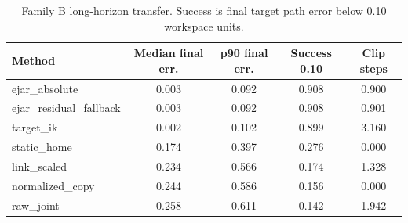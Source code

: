 \begin{table}[t]
\centering
\small
\caption{Family B long-horizon transfer. Success is final target path error below 0.10 workspace units.}
\label{tab:trajectory-v3}
\begin{tabular}{lcccc}
\toprule
Method & Median final err. & p90 final err. & Success 0.10 & Clip steps \\
\midrule
ejar\_absolute & 0.003 & 0.092 & 0.908 & 0.900 \\
ejar\_residual\_fallback & 0.003 & 0.092 & 0.908 & 0.901 \\
target\_ik & 0.002 & 0.102 & 0.899 & 3.160 \\
static\_home & 0.174 & 0.397 & 0.276 & 0.000 \\
link\_scaled & 0.234 & 0.566 & 0.174 & 1.328 \\
normalized\_copy & 0.244 & 0.586 & 0.156 & 0.000 \\
raw\_joint & 0.258 & 0.611 & 0.142 & 1.942 \\
\bottomrule
\end{tabular}
\end{table}
